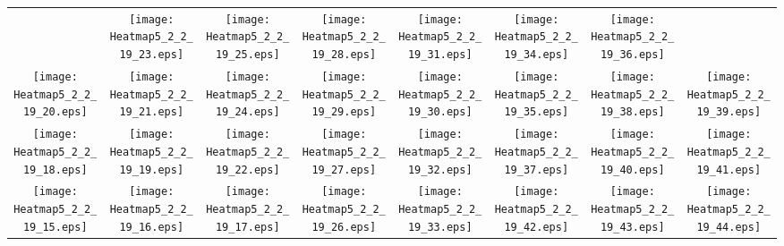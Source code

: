 \documentclass{standalone}
\begin{document}
\renewcommand{\arraystretch}{0}
\setlength{\tabcolsep}{0pt}
\begin{tabular}{ *8{c} }
 & \texttt{[image: Heatmap5\_2\_2\_19\_23.eps]} & \texttt{[image: Heatmap5\_2\_2\_19\_25.eps]} & \texttt{[image: Heatmap5\_2\_2\_19\_28.eps]} & \texttt{[image: Heatmap5\_2\_2\_19\_31.eps]} & \texttt{[image: Heatmap5\_2\_2\_19\_34.eps]} & \texttt{[image: Heatmap5\_2\_2\_19\_36.eps]} &  \\
\texttt{[image: Heatmap5\_2\_2\_19\_20.eps]} & \texttt{[image: Heatmap5\_2\_2\_19\_21.eps]} & \texttt{[image: Heatmap5\_2\_2\_19\_24.eps]} & \texttt{[image: Heatmap5\_2\_2\_19\_29.eps]} & \texttt{[image: Heatmap5\_2\_2\_19\_30.eps]} & \texttt{[image: Heatmap5\_2\_2\_19\_35.eps]} & \texttt{[image: Heatmap5\_2\_2\_19\_38.eps]} & \texttt{[image: Heatmap5\_2\_2\_19\_39.eps]} \\
\texttt{[image: Heatmap5\_2\_2\_19\_18.eps]} & \texttt{[image: Heatmap5\_2\_2\_19\_19.eps]} & \texttt{[image: Heatmap5\_2\_2\_19\_22.eps]} & \texttt{[image: Heatmap5\_2\_2\_19\_27.eps]} & \texttt{[image: Heatmap5\_2\_2\_19\_32.eps]} & \texttt{[image: Heatmap5\_2\_2\_19\_37.eps]} & \texttt{[image: Heatmap5\_2\_2\_19\_40.eps]} & \texttt{[image: Heatmap5\_2\_2\_19\_41.eps]} \\
\texttt{[image: Heatmap5\_2\_2\_19\_15.eps]} & \texttt{[image: Heatmap5\_2\_2\_19\_16.eps]} & \texttt{[image: Heatmap5\_2\_2\_19\_17.eps]} & \texttt{[image: Heatmap5\_2\_2\_19\_26.eps]} & \texttt{[image: Heatmap5\_2\_2\_19\_33.eps]} & \texttt{[image: Heatmap5\_2\_2\_19\_42.eps]} & \texttt{[image: Heatmap5\_2\_2\_19\_43.eps]} & \texttt{[image: Heatmap5\_2\_2\_19\_44.eps]} \\

\end{tabular}
\end{document}
